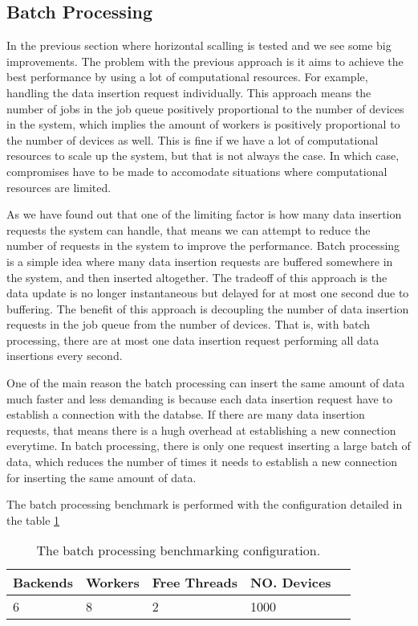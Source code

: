 \documentclass[../thesis.tex]{subfiles}
\begin{document}
\subsection{Batch Processing}

In the previous section where horizontal scalling is tested and we see some big improvements. The problem with the previous approach is it aims to achieve the best performance by using a lot of computational resources. For example, handling the data insertion request individually. This approach means the number of jobs in the job queue positively proportional to the number of devices in the system, which implies the amount of workers is positively proportional to the number of devices as well. This is fine if we have a lot of computational resources to scale up the system, but that is not always the case. In which case, compromises have to be made to accomodate situations where computational resources are limited. 

As we have found out that one of the limiting factor is how many data insertion requests the system can handle, that means we can attempt to reduce the number of requests in the system to improve the performance. Batch processing is a simple idea where many data insertion requests are buffered somewhere in the system, and then inserted altogether. The tradeoff of this approach is the data update is no longer instantaneous but delayed for at most one second due to buffering. The benefit of this approach is decoupling the number of data insertion requests in the job queue from the number of devices. That is, with batch processing, there are at most one data insertion request performing all data insertions every second. 

One of the main reason the batch processing can insert the same amount of data much faster and less demanding is because each data insertion request have to establish a connection with the databse. If there are many data insertion requests, that means there is a hugh overhead at establishing a new connection everytime. In batch processing, there is only one request inserting a large batch of data, which reduces the number of times it needs to establish a new connection for inserting the same amount of data.

The batch processing benchmark is performed with the configuration detailed in the table \ref{tab:batch}

\begin{table}[h!]
	\begin{center}
		\caption{The batch processing benchmarking configuration.}
		\label{tab:batch}
		\begin{tabular}{l|l|l|l|l}
			\toprule
			\textbf{Backends} & \textbf{Workers} & \textbf{Free Threads} & \textbf{NO. Devices}\\
			\midrule
			6 & 8 & 2 & 1000\\
			\bottomrule
		\end{tabular}
	\end{center}
\end{table}
\end{document}
